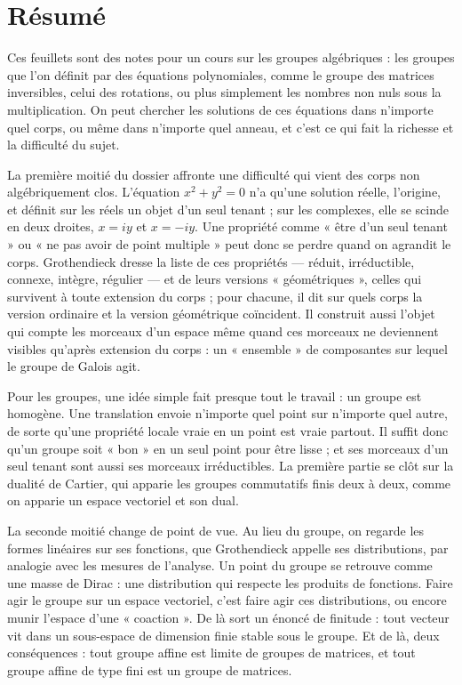 \documentclass[11pt,a4paper]{article}
\begin{document}
\section*{Résumé}

\begin{resume}
Ces feuillets sont des notes pour un cours sur les groupes algébriques : les
groupes que l'on définit par des équations polynomiales, comme le groupe des
matrices inversibles, celui des rotations, ou plus simplement les nombres non
nuls sous la multiplication. On peut chercher les solutions de ces équations
dans n'importe quel corps, ou même dans n'importe quel anneau, et c'est ce
qui fait la richesse et la difficulté du sujet.

La première moitié du dossier affronte une difficulté qui vient des corps
non algébriquement clos. L'équation $x^{2} + y^{2} = 0$ n'a qu'une solution
réelle, l'origine, et définit sur les réels un objet d'un seul tenant ; sur
les complexes, elle se scinde en deux droites, $x = iy$ et $x = -iy$. Une
propriété comme « être d'un seul tenant » ou « ne pas avoir de point
multiple » peut donc se perdre quand on agrandit le corps. Grothendieck
dresse la liste de ces propriétés --- réduit, irréductible, connexe, intègre,
régulier --- et de leurs versions « géométriques », celles qui survivent à
toute extension du corps ; pour chacune, il dit sur quels corps la version
ordinaire et la version géométrique coïncident. Il construit aussi l'objet
qui compte les morceaux d'un espace même quand ces morceaux ne deviennent
visibles qu'après extension du corps : un « ensemble » de composantes sur
lequel le groupe de Galois agit.

Pour les groupes, une idée simple fait presque tout le travail : un groupe
est homogène. Une translation envoie n'importe quel point sur n'importe quel
autre, de sorte qu'une propriété locale vraie en un point est vraie partout.
Il suffit donc qu'un groupe soit « bon » en un seul point pour être lisse ; et
ses morceaux d'un seul tenant sont aussi ses morceaux irréductibles. La
première partie se clôt sur la dualité de Cartier, qui apparie les groupes
commutatifs finis deux à deux, comme on apparie un espace vectoriel et son
dual.

La seconde moitié change de point de vue. Au lieu du groupe, on regarde les
formes linéaires sur ses fonctions, que Grothendieck appelle ses
distributions, par analogie avec les mesures de l'analyse. Un point du groupe
se retrouve comme une masse de Dirac : une distribution qui respecte les
produits de fonctions. Faire agir le groupe sur un espace vectoriel, c'est
faire agir ces distributions, ou encore munir l'espace d'une « coaction ».
De là sort un énoncé de finitude : tout vecteur vit dans un sous-espace de
dimension finie stable sous le groupe. Et de là, deux conséquences : tout
groupe affine est limite de groupes de matrices, et tout groupe affine de
type fini est un groupe de matrices.


\end{resume}
\end{document}
